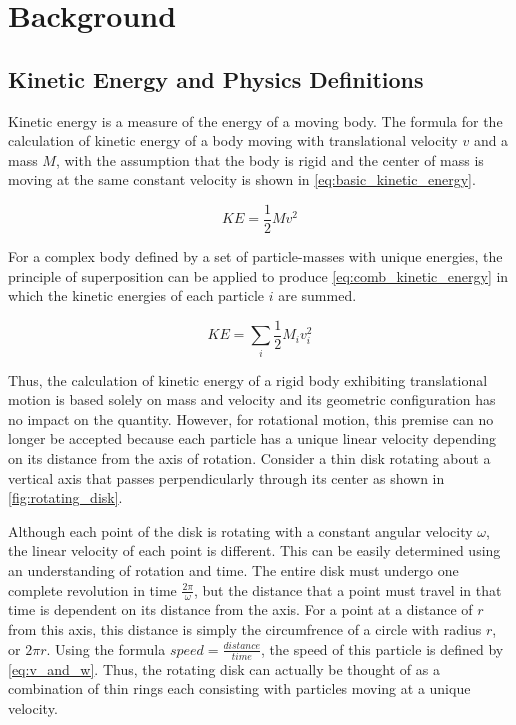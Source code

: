 \section{Background}
\label{sec:background}

\subsection{Kinetic Energy and Physics Definitions}
Kinetic energy is a measure of the energy of a moving body. The formula for the calculation of kinetic energy of a body moving with translational velocity $v$ and a mass $M$, with the assumption that the body is rigid and the center of mass is moving at the same constant velocity is shown in \cref{eq:basic_kinetic_energy}.

\begin{equation}
KE = \frac{1}{2}Mv^2
\label{eq:basic_kinetic_energy}
\end{equation}

For a complex body defined by a set of particle-masses with unique energies, the principle of superposition can be applied to produce \cref{eq:comb_kinetic_energy} in which the kinetic energies of each particle $i$ are summed.

\begin{equation}
KE = \sum_i\frac{1}{2}M_iv_i^2
\label{eq:comb_kinetic_energy}
\end{equation}

Thus, the calculation of kinetic energy of a rigid body exhibiting translational motion is based solely on mass and velocity and its geometric configuration has no impact on the quantity. However, for rotational motion, this premise can no longer be accepted because each particle has a unique linear velocity depending on its distance from the axis of rotation. Consider a thin disk rotating about a vertical axis that passes perpendicularly through its center as shown in \cref{fig:rotating_disk}.



Although each point of the disk is rotating with a constant angular velocity $\omega$, the linear velocity of each point is different. This can be easily determined using an understanding of rotation and time. The entire disk must undergo one complete revolution in time $\frac{2\pi}{\omega}$, but the distance that a point must travel in that time is dependent on its distance from the axis. For a point at a distance of $r$ from this axis, this distance is simply the circumfrence of a circle with radius $r$, or $2\pi r$. Using the formula $speed = \frac{distance}{time}$, the speed of this particle is defined by \cref{eq:v_and_w}. Thus, the rotating disk can actually be thought of as a combination of thin rings each consisting with particles moving at a unique velocity. 

